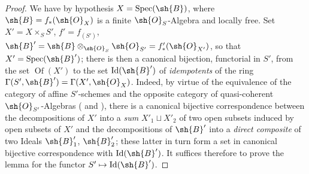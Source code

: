 \begin{proof}
We have by hypothesis $X=\operatorname{Spec}(\sh{B})$, where $\sh{B}=f_*(\sh{O}_X)$ is a finite $\sh{O}_S$-Algebra and locally free.
Set $X'=X\times_S S'$, $f'=f_{(S')}$, $\sh{B}'=\sh{B}\otimes_{\sh{O}_S}\sh{O}_{S'}=f'_*(\sh{O}_{X'})$, so that $X'=\operatorname{Spec}(\sh{B}')$;
there is then a canonical bijection, functorial in $S'$, from the set $\operatorname{Of}(X')$ to the set $\operatorname{Id}(\sh{B}')$ of \emph{idempotents} of the ring $\Gamma(S',\sh{B}')=\Gamma(X',\sh{O}_X)$.
Indeed, by virtue of the equivalence of the category of affine $S'$-schemes and the opposite category of quasi-coherent $\sh{O}_{S'}$-Algebras ( and ), there is a canonical bijective correspondence between the decompositions of $X'$ into a \emph{sum} $X'_1\sqcup X'_2$ of two open subsets induced by open subsets of $X'$ and the decompositions of $\sh{B}'$ into a \emph{direct composite} of two Ideals $\sh{B}'_1$, $\sh{B}'_2$;
these latter in turn form a set in canonical bijective correspondence with $\operatorname{Id}(\sh{B}')$.
It suffices therefore to prove the lemma for the functor $S'\mapsto\operatorname{Id}(\sh{B}')$.


\end{proof}
